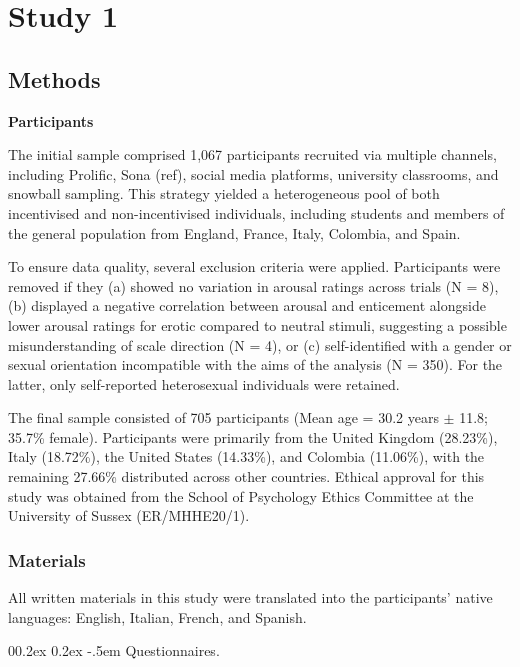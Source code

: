 \documentclass[
  jou,
  floatsintext,
  longtable,
  nolmodern,
  notxfonts,
  notimes,
  colorlinks=true,linkcolor=blue,citecolor=blue,urlcolor=blue]{apa7}
\makeatletter
\renewcommand{\paragraph}{\@startsection{paragraph}{4}{\parindent}%
	{0\baselineskip \@plus 0.2ex \@minus 0.2ex}%
	{-.5em}%
	{\normalfont\normalsize\bfseries\typesectitle}}
\makeatother
\begin{document}
\section{Study 1}\label{study-1}

\subsection{Methods}\label{methods}

\textbf{Participants}

The initial sample comprised 1,067 participants recruited via multiple
channels, including Prolific\textcopyright, Sona (ref), social media
platforms, university classrooms, and snowball sampling. This strategy
yielded a heterogeneous pool of both incentivised and non-incentivised
individuals, including students and members of the general population
from England, France, Italy, Colombia, and Spain.

To ensure data quality, several exclusion criteria were applied.
Participants were removed if they (a) showed no variation in arousal
ratings across trials (N = 8), (b) displayed a negative correlation
between arousal and enticement alongside lower arousal ratings for
erotic compared to neutral stimuli, suggesting a possible
misunderstanding of scale direction (N = 4), or (c) self-identified with
a gender or sexual orientation incompatible with the aims of the
analysis (N = 350). For the latter, only self-reported heterosexual
individuals were retained.

The final sample consisted of 705 participants (Mean age = 30.2 years
\(\pm\) 11.8; 35.7\% female). Participants were primarily from the
United Kingdom (28.23\%), Italy (18.72\%), the United States (14.33\%),
and Colombia (11.06\%), with the remaining 27.66\% distributed across
other countries. Ethical approval for this study was obtained from the
School of Psychology Ethics Committee at the University of Sussex
(ER/MHHE20/1).

\subsubsection{Materials}\label{materials}

All written materials in this study were translated into the
participants' native languages: English, Italian, French, and Spanish.

\paragraph{Questionnaires.}\label{questionnaires}
\end{document}
